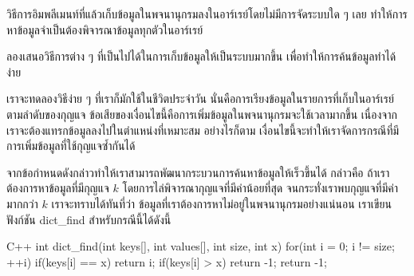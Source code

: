 วิธีการ{\wbr}อิม{\wbr}พลี{\wbr}เมนท์{\wbr}ที่แล้ว{\wbr}เก็บ{\wbr}ข้อมูล{\wbr}ใน{\wbr}พจนานุกรม{\wbr}ลง{\wbr}ใน{\wbr}อาร์เรย์{\wbr}โดย{\wbr}ไม่{\wbr}มี{\wbr}การ{\wbr}จัด{\wbr}ระบบ{\wbr}ใด ๆ เลย{\wbr}
ทำ{\wbr}ให้การ{\wbr}หา{\wbr}ข้อมูล{\wbr}จำเป็น{\wbr}ต้อง{\wbr}พิจารณา{\wbr}ข้อมูล{\wbr}ทุก{\wbr}ตัว{\wbr}ใน{\wbr}อาร์เรย์

\begin{quiz}{}
ลอง{\wbr}เสนอ{\wbr}วิธีการ{\wbr}ต่าง ๆ ที่{\wbr}เป็น{\wbr}ไป{\wbr}ได้{\wbr}ใน{\wbr}การ{\wbr}เก็บ{\wbr}ข้อมูล{\wbr}ให้{\wbr}เป็น{\wbr}ระบบ{\wbr}มาก{\wbr}ขึ้น{\wbr}
เพื่อ{\wbr}ทำ{\wbr}ให้การ{\wbr}ค้น{\wbr}ข้อมูล{\wbr}ทำ{\wbr}ได้{\wbr}ง่าย{\wbr}
\end{quiz}

เรา{\wbr}จะ{\wbr}ทดลอง{\wbr}วิธี{\wbr}ง่าย ๆ ที่{\wbr}เรา{\wbr}ก็{\wbr}มัก{\wbr}ใช้{\wbr}ใน{\wbr}ชีวิต{\wbr}ประจำวัน{\wbr}
นั่น{\wbr}คือ{\wbr}การ{\wbr}เรียง{\wbr}ข้อมูล{\wbr}ใน{\wbr}รายการ{\wbr}ที่{\wbr}เก็บ{\wbr}ใน{\wbr}อาร์เรย์{\wbr}ตาม{\wbr}ลำดับ{\wbr}ของ{\wbr}กุญแจ{\wbr}
ข้อเสีย{\wbr}ของ{\wbr}เงื่อนไข{\wbr}นี้{\wbr}คือ{\wbr}การ{\wbr}เพิ่ม{\wbr}ข้อมูล{\wbr}ใน{\wbr}พจนานุกรม{\wbr}จะ{\wbr}ใช้เวลา{\wbr}มาก{\wbr}ขึ้น{\wbr}
เนื่องจาก{\wbr}เรา{\wbr}จะ{\wbr}ต้อง{\wbr}แทรก{\wbr}ข้อมูล{\wbr}ลง{\wbr}ไป{\wbr}ใน{\wbr}ตำแหน่ง{\wbr}ที่{\wbr}เหมาะสม อย่างไรก็ตาม{\wbr}
เงื่อนไข{\wbr}นี้{\wbr}จะ{\wbr}ทำ{\wbr}ให้{\wbr}เรา{\wbr}จัดการ{\wbr}กรณี{\wbr}ที่{\wbr}มี{\wbr}การ{\wbr}เพิ่ม{\wbr}ข้อมูล{\wbr}ที่{\wbr}ใช้{\wbr}กุญแจ{\wbr}ซ้ำ{\wbr}กัน{\wbr}ได้{\wbr}

จาก{\wbr}ข้อกำหนด{\wbr}ดังกล่าว{\wbr}ทำ{\wbr}ให้{\wbr}เรา{\wbr}สามารถ{\wbr}พัฒนา{\wbr}กระบวนการ{\wbr}ค้นหา{\wbr}ข้อมูล{\wbr}ให้{\wbr}เร็ว{\wbr}ขึ้น{\wbr}ได้ กล่าวคือ{\wbr}
ถ้า{\wbr}เรา{\wbr}ต้องการ{\wbr}หา{\wbr}ข้อมูล{\wbr}ที่{\wbr}มี{\wbr}กุญแจ $k$ โดย{\wbr}การ{\wbr}ไล่{\wbr}พิจารณา{\wbr}กุญแจ{\wbr}ที่{\wbr}มี{\wbr}ค่า{\wbr}น้อย{\wbr}ที่สุด{\wbr}
จนกระทั่ง{\wbr}เรา{\wbr}พบ{\wbr}กุญแจ{\wbr}ที่{\wbr}มี{\wbr}ค่า{\wbr}มาก{\wbr}กว่า $k$ เรา{\wbr}จะ{\wbr}ทราบ{\wbr}ได้{\wbr}ทัน{\wbr}ที่{\wbr}ว่า{\wbr}
ข้อมูล{\wbr}ที่{\wbr}เรา{\wbr}ต้องการ{\wbr}หาไม่{\wbr}อยู่{\wbr}ใน{\wbr}พจนานุกรม{\wbr}อย่าง{\wbr}แน่นอน เรา{\wbr}เขียน{\wbr}ฟังก์ชัน {\ct dict\_find}
สำหรับ{\wbr}กรณี{\wbr}นี้{\wbr}ได้{\wbr}ดังนี้{\wbr}

\latintext
\begin{codelist}{C++}{}
int dict_find(int keys[], int values[], int size, int x)
{
  for(int i = 0; i != size; ++i) {
    if(keys[i] == x)
      return i;
    if(keys[i] > x)
      return -1;
  }
  return -1; 
}
\end{codelist}
\thaitext

